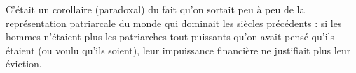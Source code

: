  C'était un corollaire (paradoxal) du fait qu'on sortait peu à peu de la représentation patriarcale du monde qui dominait les siècles précédents : si les hommes n'étaient plus les patriarches tout-puissants qu'on avait pensé qu'ils étaient (ou voulu qu'ils soient), leur impuissance financière ne justifiait plus leur éviction.
 
 